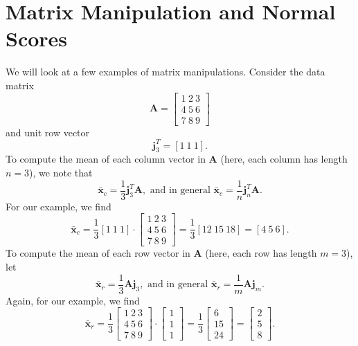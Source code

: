 \section{Matrix Manipulation and Normal Scores}
We will look at a few examples of matrix manipulations. Consider the data matrix
\begin{equation}
\mathbf{A} = \left[ \begin{array}{c}
1 \ 2 \ 3 \\
4 \ 5 \ 6 \\7 \ 8 \ 9
\end{array} \right ]
\end{equation}
and unit row vector
\begin{equation}
\mathbf{j}^T_3 = [1 \ 1 \ 1].
\end{equation} 
To compute the mean of each column vector in $\mathbf{A}$ (here, each column has length $n = 3$), we note that
\begin{equation}
\mathbf{\bar{x}} _c = \frac{1}{3} \mathbf{j}^T_3 \mathbf{A}, \mbox{ and in general } \mathbf{\bar{x}} _c = \frac{1}{n} \mathbf{j}^T_n \mathbf{A}.
\end{equation}	
For our example, we find
\begin{equation}
\mathbf{\bar{x}}_c = \frac{1}{3} \left[ 1 \  1\  1 \right ] \cdot
\left[ \begin{array}{c}
1 \ 2 \ 3 \\ 4 \ 5 \ 6 \\ 7 \ 8 \ 9 \end{array} \right ] 
= \frac{1}{3} \left[ 12 \ 15 \ 18 \right] =  \left[ 4 \ 5 \ 6 \right].
\end{equation}
To compute the mean of each row vector in $\mathbf{A}$ (here, each row has length $m = 3$), let
\begin{equation}
\mathbf{\bar{x}}_r = \frac{1}{3} \mathbf{Aj}_3, \mbox{ and in general }  \mathbf{\bar{x}}_r = \frac{1}{m} \mathbf{Aj}_m .
\end{equation} 
Again, for our example, we find
\begin{equation}
\mathbf{\bar{x}}_r = \frac{1}{3}
\left [ \begin{array}{c}
1 \ 2 \ 3 \\
4 \ 5 \ 6 \\
7 \ 8 \ 9 
\end{array} \right ] \cdot 
\left [ \begin{array}{c}
1\\
1\\
1
\end{array} \right ] = \frac{1}{3}
\left[
\begin{array}{c}
6 \\
15\\
24 \end{array} \right ] 
=
\left[
\begin{array}{c}
2 \\
5\\
8 \end{array} \right ].
\end{equation}
